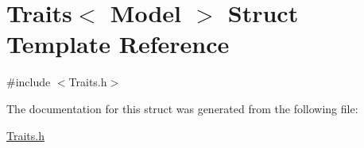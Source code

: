 \hypertarget{struct_traits_3_01_model_01_4}{\section{Traits$<$ Model $>$ Struct Template Reference}
\label{struct_traits_3_01_model_01_4}
}


{\ttfamily \#include $<$Traits.\-h$>$}



The documentation for this struct was generated from the following file\-:\begin{DoxyCompactItemize}
\item 
\hyperlink{_traits_8h}{Traits.\-h}\end{DoxyCompactItemize}

